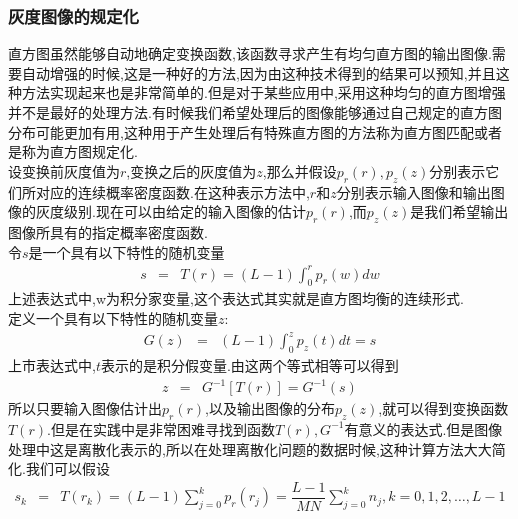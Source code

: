 \documentclass[UTF8,a4paper,10pt]{ctexart}
\begin{document}
\begin{flushleft}
        \subsubsection{灰度图像的规定化}
        \hspace{2em}直方图虽然能够自动地确定变换函数,该函数寻求产生有均匀直方图的输出图像.需要自动增强的时候,这是一种好的方法,因为由这种技术得到的结果可以预知,并且这种方法实现起来也是非常简单的.但是对于某些应用中,采用这种均匀的直方图增强并不是最好的处理方法.有时候我们希望处理后的图像能够通过自己规定的直方图分布可能更加有用,这种用于产生处理后有特殊直方图的方法称为直方图匹配或者是称为直方图规定化.\\
        \hspace{2em}设变换前灰度值为$r$,变换之后的灰度值为$z$,那么并假设$p_{r}(r),p_{z}(z)$分别表示它们所对应的连续概率密度函数.在这种表示方法中,$r$和$z$分别表示输入图像和输出图像的灰度级别.现在可以由给定的输入图像的估计$p_{r}(r)$,而$p_{z}(z)$是我们希望输出图像所具有的指定概率密度函数.\\
        \hspace{2em}令$s$是一个具有以下特性的随机变量
        \begin{eqnarray}
            s&=&T(r)=(L-1)\int_{0}^{r}p_{r}(w)dw\nonumber
        \end{eqnarray}
        上述表达式中,w为积分家变量,这个表达式其实就是直方图均衡的连续形式.\\
        \hspace{2em}定义一个具有以下特性的随机变量$z$:
        \begin{eqnarray}
            G(z)&=&(L-1)\int_{0}^{z}p_{z}(t)dt=s\nonumber
        \end{eqnarray}
        上市表达式中,$t$表示的是积分假变量.由这两个等式相等可以得到
        \begin{eqnarray}
            z&=&G^{-1}\left[T(r)\right]=G^{-1}(s)\nonumber
        \end{eqnarray}
        \hspace{2em}所以只要输入图像估计出$p_{r}(r)$,以及输出图像的分布$p_{z}(z)$,就可以得到变换函数$T(r)$.但是在实践中是非常困难寻找到函数$T(r),G^{-1}$有意义的表达式.但是图像处理中这是离散化表示的,所以在处理离散化问题的数据时候,这种计算方法大大简化.我们可以假设\\
        \begin{eqnarray}
            s_{k}&=&T(r_{k})=(L-1)\sum\limits_{j=0}^{k}p_{r}(r_{j})=\dfrac{L-1}{MN}\sum\limits_{j=0}^{k}n_{j},k=0,1,2,\dots,L-1\label{equ:s_formual}
        \end{eqnarray}

\end{flushleft}
\end{document}
